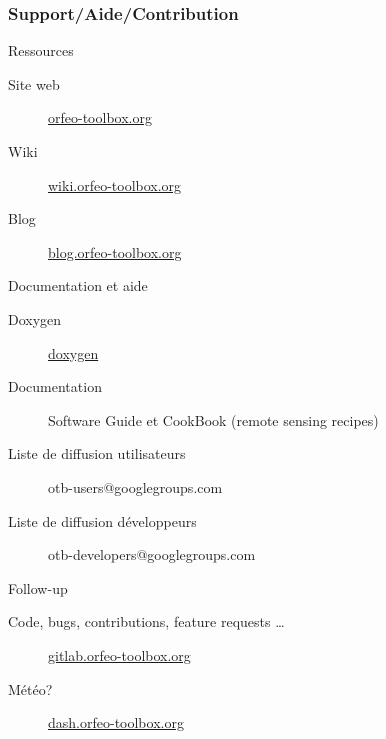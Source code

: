 \documentclass[8pt]{beamer}
\begin{document}
\begin{frame}
\frametitle{Support/Aide/Contribution}
\vspace{-0.2cm}
\begin{block}{Ressources}
\vspace{-0.2cm}
\begin{description}
\item[Site web] \href{http://www.orfeo-toolbox.org}{orfeo-toolbox.org}
\item[Wiki] \href{http://wiki.orfeo-toolbox.org}{wiki.orfeo-toolbox.org}
\item[Blog] \href{http://blog.orfeo-toolbox.org}{blog.orfeo-toolbox.org}
\end{description}
\end{block}
\vspace{-0.2cm}
\begin{block}{Documentation et aide}
\vspace{-0.2cm}
\begin{description}
\item[Doxygen] \href{http://www.orfeo-toolbox.org/doxygen/}{doxygen}
\item[Documentation] Software Guide et CookBook (remote sensing recipes)
\item[Liste de diffusion utilisateurs] otb-users@googlegroups.com
\item[Liste de diffusion développeurs] otb-developers@googlegroups.com
\end{description}
\end{block}
\vspace{-0.2cm}
\begin{block}{Follow-up}
\vspace{-0.2cm}
\begin{description}
\item[Code, bugs, contributions, feature requests \ldots] \href{https://gitlab.orfeo-toolbox.org/orfeotoolbox/otb}{gitlab.orfeo-toolbox.org}
\item[Météo?] \href{http://dash.orfeo-toolbox.org}{dash.orfeo-toolbox.org}
\end{description}
\end{block}
\end{frame}
\end{document}
